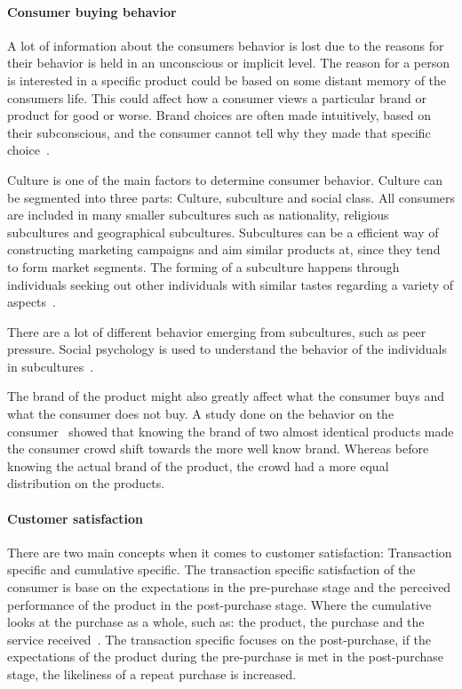 \paragraph{Consumer buying behavior}

A lot of information about the consumers behavior is lost due to the reasons
for their behavior is held in an unconscious or implicit level.  The reason for
a person is interested in a specific product could be based on some distant
memory of the consumers life.  This could affect how a consumer views a
particular brand or product for good or worse.  Brand choices are often made
intuitively, based on their subconscious, and the consumer cannot tell why
they made that specific choice~\cite{vignali2009fashion}.

Culture is one of the main factors to determine consumer behavior.  Culture can
be segmented into three parts: Culture, subculture and social class.  All
consumers are included in many smaller subcultures such as nationality,
religious subcultures and geographical subcultures.  Subcultures can be a
efficient way of constructing marketing campaigns and aim similar products at,
since they tend to form market segments.  The forming of a subculture happens
through individuals seeking out other individuals with similar tastes regarding
a variety of aspects~\cite{vignali2009fashion}.

There are a lot of different behavior emerging from subcultures, such as peer
pressure.  Social psychology is used to understand the behavior of the
individuals in subcultures~\cite{vignali2009fashion}.

The brand of the product might also greatly affect what the consumer buys and
what the consumer does not buy.  A study done on the behavior on the
consumer~\cite{deLace2011} showed that knowing the brand of two almost
identical products made the consumer crowd shift towards the more well know
brand.  Whereas before knowing the actual brand of the product, the crowd had a
more equal distribution on the products.

\paragraph{Customer satisfaction}

There are two main concepts when it comes to customer satisfaction: Transaction
specific and cumulative specific.  The transaction specific satisfaction of the
consumer is base on the expectations in the pre-purchase stage and the
perceived performance of the product in the post-purchase stage.  Where the
cumulative looks at the purchase as a whole, such as: the product, the purchase
and the service received~\cite{kumari2012}.  The transaction specific focuses
on the post-purchase, if the expectations of the product during the
pre-purchase is met in the post-purchase stage, the likeliness of a repeat
purchase is increased.

